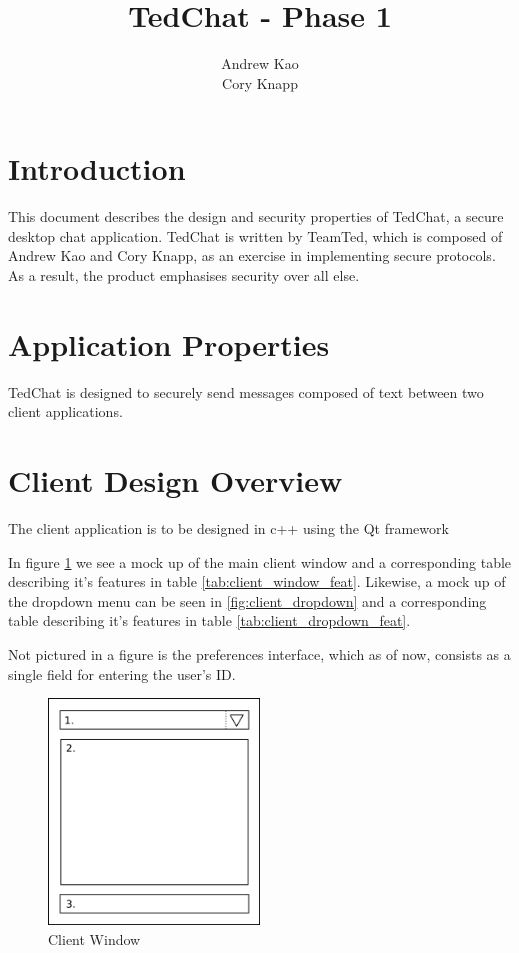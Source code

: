 \documentclass[12pt]{article}
\title{TedChat - Phase 1}
\author{Andrew Kao\\ Cory Knapp}
\begin{document}
\maketitle

\section{Introduction}
	This document describes the design and security properties of TedChat, a
	secure desktop chat application.  TedChat is written by TeamTed, which is
	composed of Andrew Kao and Cory Knapp, as an exercise in implementing
	secure protocols. As a result, the product emphasises security over all
	else.
		
\section{Application Properties}
	TedChat is designed to securely send messages composed of text between two client applications.

\section{Client Design Overview}
The client application is to be designed in c++ using the Qt framework

In figure \ref{fig:client_window} we see a mock up of the main client window
and a corresponding table describing it's features in table
\ref{tab:client_window_feat}.  Likewise, a mock up of the dropdown menu can be
seen in \ref{fig:client_dropdown} 
and a corresponding table describing it's features in table
\ref{tab:client_dropdown_feat}.  

Not pictured in a figure is the preferences interface, which as of now, consists 
as a single field for entering the user's ID.

\begin{figure}[htpb]    
\label{fig:client_window}	
\caption{Client Window}
\centering
\includegraphics[width=0.5\textwidth]{client_window}
\end{figure}
\end{document}
